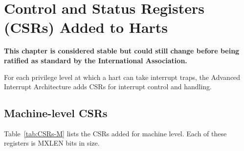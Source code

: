 
\chapter{Control and Status Registers (CSRs) Added to Harts}
\label{ch:CSRs}

\textbf{%
This chapter is considered stable but could still change before being
ratified as standard by the {\RISCV} International Association.%
}
\bigskip

For each privilege level at which a {\RISCV} hart can take interrupt
traps, the Advanced Interrupt Architecture adds CSRs for interrupt
control and handling.

\section{Machine-level CSRs}

Table~\ref{tab:CSRs-M} lists the CSRs added for machine level.
Each of these registers is MXLEN bits in size.

